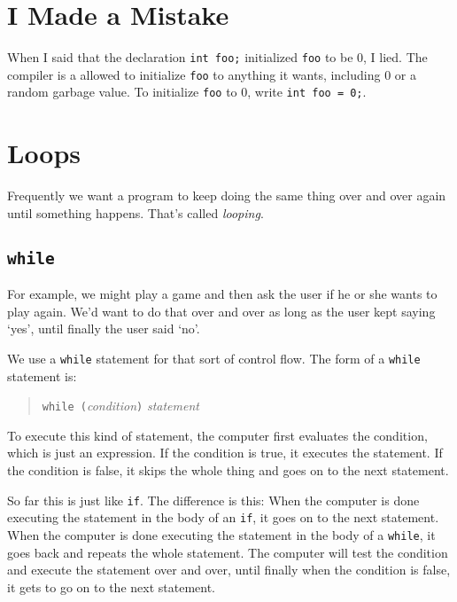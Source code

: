 %
%
%

\section{I Made a Mistake}

When I said that the declaration {\tt int foo;} initialized {\tt foo} to
be 0, I lied.  The compiler is a allowed to initialize {\tt foo} to
anything it wants, including 0 or a random garbage value.  To initialize
{\tt foo} to 0, write {\tt int foo = 0;}.  

\section{Loops}

Frequently we want a program to keep doing the same thing over and over
again until something happens.  That's called {\em looping}\/.

\subsection{{\tt while}}

For example, we might play a game and then ask the user if he or she
wants to play again.  We'd want to do that over and over as long as the
user kept saying `yes', until finally the user said `no'.

We use a {\tt while} statement for that sort of control flow.  The form
of a {\tt while} statement is:

\begin{quote}
{\tt while (}{\it condition}\/{\tt )} {\it statement}

\end{quote}

To execute this kind of statement, the computer first evaluates the
condition, which is just an expression.  If the condition is true, it
executes the statement.  If the condition is false, it skips the whole
thing and goes on to the next statement.

So far this is just like {\tt if}.  The difference is this: When the
computer is done executing the statement in the body of an {\tt if}, it
goes on to the next statement.  When the computer is done executing the
statement in the body of a {\tt while}, it goes back and repeats the
whole statement.  The computer will test the condition and execute the
statement over and over, until finally when the condition is false, it
gets to go on to the next statement.

